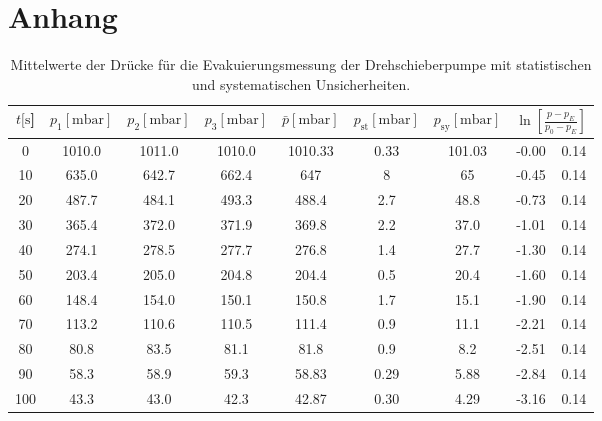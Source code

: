 \section*{Anhang}
\begin{table}[H]
    \centering
      \caption{Mittelwerte der Drücke für die Evakuierungsmessung der Drehschieberpumpe mit statistischen und systematischen Unsicherheiten.}
      \label{tab:Dreh_Evak}
      \tiny{
      \begin{tabular}{
        S[table-format=3.0] 
        S[table-format=4.2]
        S[table-format=4.2]
        S[table-format=4.2]
        S[table-format=4.2] 
        S[table-format=1.3] 
        S[table-format=3.2] 
        S[table-format=2.2] @{${}\pm{}$} S[table-format=1.2]}
        \toprule
        {$t [\si{\second}$]} &
        {$p_1 [\si{\milli\bar}]$} &
        {$p_2 [\si{\milli\bar}]$} &
        {$p_3 [\si{\milli\bar}]$} & 
        {$\bar{p} [\si{\milli\bar}]$} & 
        {$p_\text{st} [\si{\milli\bar}]$} & 
        {$p_\text{sy} [\si{\milli\bar}]$} & 
         \\            
           & 1010.0 & 1011.0 & 1010.0 & 1010.33 & 0.33    & 101.03 & -0.00 & 0.14 \\
        10  & 635.0  & 642.7  & 662.4  & 647     & 8       & 65     & -0.45 & 0.14 \\
        20  & 487.7  & 484.1  & 493.3  & 488.4   & 2.7     & 48.8   & -0.73 & 0.14 \\
        30  & 365.4  & 372.0  & 371.9  & 369.8   & 2.2     & 37.0   & -1.01 & 0.14 \\
        40  & 274.1  & 278.5  & 277.7  & 276.8   & 1.4     & 27.7   & -1.30 & 0.14 \\
        50  & 203.4  & 205.0  & 204.8  & 204.4   & 0.5     & 20.4   & -1.60 & 0.14 \\
        60  & 148.4  & 154.0  & 150.1  & 150.8   & 1.7     & 15.1   & -1.90 & 0.14 \\
        70  & 113.2  & 110.6  & 110.5  & 111.4   & 0.9     & 11.1   & -2.21 & 0.14 \\
        80  & 80.8   & 83.5   & 81.1   & 81.8    & 0.9     & 8.2    & -2.51 & 0.14 \\
        90  & 58.3   & 58.9   & 59.3   & 58.83   & 0.29    & 5.88   & -2.84 & 0.14 \\
        100 & 43.3   & 43.0   & 42.3   & 42.87   & 0.30    & 4.29   & -3.16 & 0.14 \\

\end{tabular}}
\end{table}
